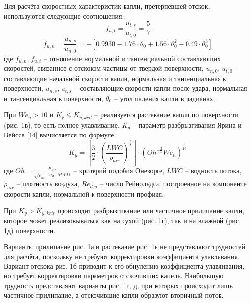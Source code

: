 \documentclass{psta}%
\begin{document}
Для расчёта скоростных характеристик капли, претерпевшей отскок, используются следующие соотношения:
\begin{equation*}
	f_{u,t} = \frac{u_{t,s}}{u_{t,0}} = \frac{5}{7}
\end{equation*}
\begin{equation*}
	f_{u,n} = \frac{u_{n,s}}{u_{n,0}} = -\left[ 0.9930 - 1.76 \cdot \theta_0 + 1.56 \cdot \theta_0^2 - 0.49 \cdot \theta_0^3 \right]
\end{equation*}
где $f_{u,n}$, $f_{u,t}$ -- отношение нормальной и тангенциальной составляющих скоростей, связанное с отскоком частицы от твердой поверхности, $u_{n,0}$, $u_{t,0}$ -- составляющие начальной скорости капли, нормальная и тангенциальная к поверхности, $u_{n,s}$, $u_{t,s}$ -- составляющие скорости капли после удара, нормальная и тангенциальная к поверхности, $\theta_0$ -- угол падения капли в радианах.

При $We_n > 10$ и $K_y \le K_{y,krit}$ -- реализуется растекание капли по поверхности (рис. 1в), то есть полное улавливание.
$K_y$ -- параметр разбрызгивания Ярина и Вейсса [14] вычисляется по формуле:
\begin{equation}
	K_y = \left[ \frac{3}{2} \cdot \left( \frac{LWC}{\rho_{air}} \right)^{\frac{3}{8}} \right] \cdot \left( Oh^{-\frac{2}{5}} W e_n \right)^{\frac{5}{16}}
\end{equation}
где $Oh = \frac{\mu_{air}}{\sqrt{\rho_{air} \cdot \sigma_d \cdot MWD}}$ -- критерий подобия Онезорге, $LWC$ -- водность потока, $\rho_{air}$ -- плотность воздуха, $Re_{d,n}$ -- число Рейнольдса, построенное на компоненте скорости капли, нормальной к поверхности профиля.

При $K_y > K_{y,krit}$ происходит разбрызгивание или частичное прилипание капли, которое может реализовываться как на сухой (рис. 1г), так и на влажной (рис. 1д) поверхности.

Варианты прилипание рис. 1а и растекание рис. 1в не представляют трудностей для расчёта, поскольку не требуют корректировки коэффициента улавливания.
Вариант отскока рис. 1б приводит к его обнулению коэффициента улавливания, но требует корректировки параметров отскочивших капель.
Наибольшую трудность представляют варианты рис. 1г, д, при которых происходит лишь частичное прилипание, а отскочившие капли образуют вторичный поток. 
\end{document}
